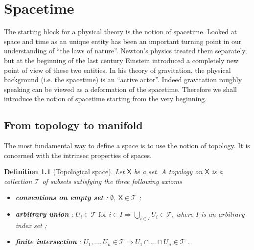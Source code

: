 \documentclass[11pt]{book}
\newcommand{\Tcal}{\mathcal{T}}
\newcommand{\Xsf}{\mathsf{X}}
\theoremstyle{break}
\newtheorem{definition}{Definition}
\begin{document}
\chapter{Spacetime}



The starting block for a physical theory is the notion of spacetime. Looked at space and time as an unique entity has been an important turning point in our understanding of ``the laws of nature''. Newton's physics treated them separately, but at the beginning of the last century Einstein introduced a completely new point of view of these two entities. In his theory of gravitation, the physical background (i.e. the spacetime) is an ``active actor''. Indeed gravitation roughly speaking can be viewed as a deformation of the spacetime. Therefore we shall introduce the notion of spacetime starting from the very beginning.


\section{From topology to manifold}

The most fundamental way to define a space is to use the notion of topology. It is concerned with the intrinsec properties of spaces.

\begin{definition}[Topological space] 
Let $\Xsf$ be a set. A topology on $\Xsf$ is a collection $\Tcal$ of subsets satisfying the three following axioms%
%
\begin{itemize}
\vspace*{-4pt}
\setlength{\itemsep}{-1pt}
\item \textbf{conventions on empty set} : $\emptyset , \ \Xsf \in \Tcal$ ;
\item \textbf{arbitrary union} : $U_i \in \Tcal \mbox{ for } i \in I \Longrightarrow \bigcup_{i\in I} U_i \in \Tcal$, where $I$ is an arbitrary index set ;
\item \textbf{finite intersection} : $U_1 , \dots , U_n \in \Tcal \Longrightarrow U_1 \cap \dots \cap U_n \in \Tcal$ .
\end{itemize}
%
\end{definition}
\end{document}
